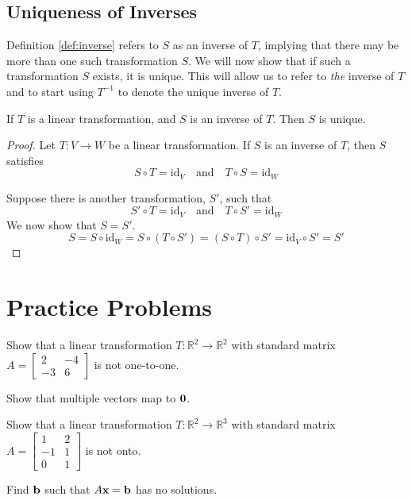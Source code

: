 \documentclass{ximera}
\renewcommand{\vec}[1]{{\bf #1}}
\newcommand{\RR}{\mathbb{R}}
\newcommand{\id}{\text{id}}
\begin{document}
\subsection*{Uniqueness of Inverses}

Definition \ref{def:inverse} refers to $S$ as an inverse of $T$, implying that there may be more than one such transformation $S$.  We will now show that if such a transformation $S$ exists, it is unique.  This will allow us to refer to {\it the} inverse of $T$ and to start using $T^{-1}$ to denote the unique inverse of $T$.

\begin{theorem}\label{th:inverseisunique}
If $T$ is a linear transformation, and $S$ is an inverse of $T$.  Then $S$ is unique.
\end{theorem}
\begin{proof}
Let $T:V\rightarrow W$ be a linear transformation.  If $S$ is an inverse of $T$, then $S$ satisfies
$$S\circ T=\id_V\quad \text{and}\quad T\circ S=\id_W$$

Suppose there is another transformation, $S'$, such that 
$$S'\circ T=\id_V\quad \text{and}\quad T\circ S'=\id_W$$
We now show that $S=S'$.
$$S=S\circ \id_W=S\circ(T\circ S')=(S\circ T)\circ S'=\id_V\circ S'=S'$$
\end{proof}

\section*{Practice Problems}
\begin{problem}
Show that a linear transformation $T:\RR^2\rightarrow \RR^2$ with standard matrix $A=\begin{bmatrix}2&-4\\-3&6\end{bmatrix}$ is not one-to-one.
\begin{hint}
        Show that multiple vectors map to $\vec{0}$.
      \end{hint}
\end{problem}
 
 \begin{problem}
 Show that a linear transformation $T:\RR^2\rightarrow \RR^3$ with standard matrix $A=\begin{bmatrix}1&2\\-1&1\\0&1\end{bmatrix}$ is not onto.
 \begin{hint}
 Find $\vec{b}$ such that $A\vec{x}=\vec{b}$ has no solutions.
 \end{hint}
 \end{problem}
 
\end{document}
